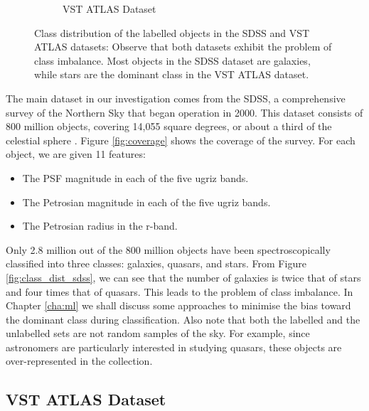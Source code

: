 \begin{figure}[p]
\begin{subfigure}{.5\textwidth}
        \caption{VST ATLAS Dataset}
        \label{fig:class_dist_vst}
    \end{subfigure}
    \caption[Distribution of the classes in the SDSS and VST ATLAS datasets]{
        Class distribution of the labelled objects in the SDSS and VST ATLAS datasets: Observe
        that both datasets exhibit the problem of class imbalance. Most objects in the
        SDSS dataset are galaxies, while stars are the dominant class in the VST ATLAS dataset.}
    \label{fig:class_dist}
\end{figure}

The main dataset in our investigation comes from the SDSS, a comprehensive survey of the Northern
Sky that began operation in 2000. This dataset consists of 800 million objects, covering 14,055
square degrees, or about a third of the celestial sphere \cite{alam15}. Figure \ref{fig:coverage}
shows the coverage of the survey. For each object, we are given 11 features:
	\begin{itemize}
		\item The PSF magnitude in each of the five ugriz bands.
		\item The Petrosian magnitude in each of the five ugriz bands.
		\item The Petrosian radius in the r-band.
	\end{itemize}
Only 2.8 million out of the 800 million objects have been spectroscopically classified into three
classes: galaxies, quasars, and stars. From Figure \ref{fig:class_dist_sdss}, we can see that the
number of galaxies is twice that of stars and four times that of quasars. This leads to the
problem of class imbalance. In Chapter \ref{cha:ml} we shall discuss some approaches to minimise
the bias toward the dominant class during classification. Also note that both the labelled and the
unlabelled sets are not random samples of the sky. For example, since astronomers are particularly
interested in studying quasars, these objects are over-represented in the collection.




\subsection{VST ATLAS Dataset} 
\label{sub:vstatlas}

